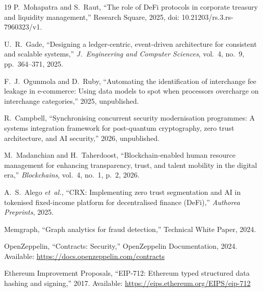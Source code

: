 \documentclass[journal]{IEEEtran}
\begin{document}
\begin{thebibliography}{19}
P.~Mohapatra and S.~Raut, ``The role of DeFi protocols in corporate treasury and liquidity management,'' Research Square, 2025, doi: 10.21203/rs.3.rs-7960323/v1.

U.~R.~Gade, ``Designing a ledger-centric, event-driven architecture for consistent and scalable systems,'' \textit{J.\ Engineering and Computer Sciences}, vol.~4, no.~9, pp.~364--371, 2025.

F.~J.~Ogunmola and D.~Ruby, ``Automating the identification of interchange fee leakage in e-commerce: Using data models to spot when processors overcharge on interchange categories,'' 2025, unpublished.

R.~Campbell, ``Synchronising concurrent security modernisation programmes: A systems integration framework for post-quantum cryptography, zero trust architecture, and AI security,'' 2026, unpublished.

M.~Madanchian and H.~Taherdoost, ``Blockchain-enabled human resource management for enhancing transparency, trust, and talent mobility in the digital era,'' \textit{Blockchains}, vol.~4, no.~1, p.~2, 2026.

A.~S.~Alego \textit{et~al.}, ``CRX: Implementing zero trust segmentation and AI in tokenised fixed-income platform for decentralised finance (DeFi),'' \textit{Authorea Preprints}, 2025.

Memgraph, ``Graph analytics for fraud detection,'' Technical White Paper, 2024.

OpenZeppelin, ``Contracts: Security,'' OpenZeppelin Documentation, 2024. Available: \url{https://docs.openzeppelin.com/contracts}

Ethereum Improvement Proposals, ``EIP-712: Ethereum typed structured data hashing and signing,'' 2017. Available: \url{https://eips.ethereum.org/EIPS/eip-712}

\end{thebibliography}
\end{document}
